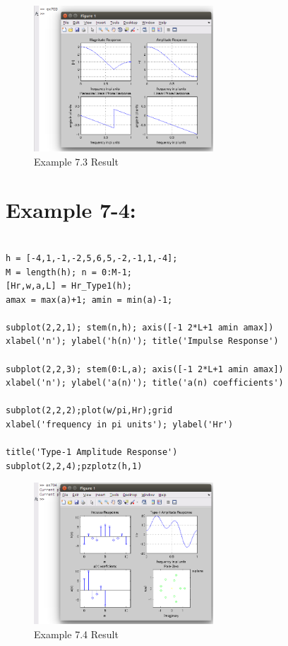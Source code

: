 \documentclass[11pt
  , a4paper
  , article
  , oneside
]{memoir}
\begin{document}
\begin{figure}[h!]
	\centering
	\includegraphics[width=0.6\textwidth,height=0.4\textwidth]{./images/ex703.png}
	\caption{Example 7.3 Result}
	\label{fig:Example 7.3 Result}
\end{figure}

\clearpage
\chapter{Example 7-4:}
\begin{lstlisting}[style=termstyle]
% Example 7.4

h = [-4,1,-1,-2,5,6,5,-2,-1,1,-4];
M = length(h); n = 0:M-1;
[Hr,w,a,L] = Hr_Type1(h);
amax = max(a)+1; amin = min(a)-1;

subplot(2,2,1); stem(n,h); axis([-1 2*L+1 amin amax])
xlabel('n'); ylabel('h(n)'); title('Impulse Response')

subplot(2,2,3); stem(0:L,a); axis([-1 2*L+1 amin amax])
xlabel('n'); ylabel('a(n)'); title('a(n) coefficients')

subplot(2,2,2);plot(w/pi,Hr);grid
xlabel('frequency in pi units'); ylabel('Hr')

title('Type-1 Amplitude Response')
subplot(2,2,4);pzplotz(h,1)

\end{lstlisting}

\begin{figure}[h!]
	\centering
	\includegraphics[width=0.6\textwidth,height=0.4\textwidth]{./images/ex704.png}
	\caption{Example 7.4 Result}
	\label{fig:Example 7.4 Result}
\end{figure}
\end{document}
